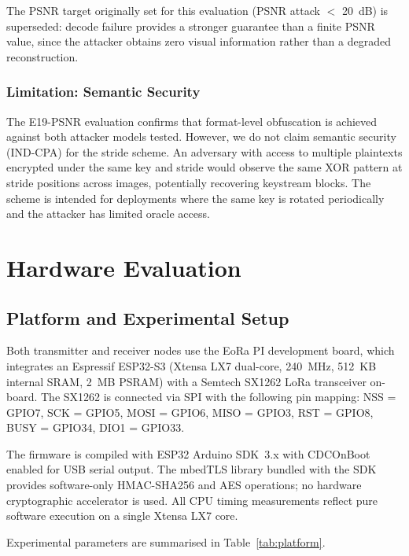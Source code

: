\documentclass[journal]{IEEEtran}
\begin{document}
The PSNR target originally set for this evaluation (PSNR attack $<$ 20~dB) is
superseded: decode failure provides a stronger guarantee than a finite PSNR
value, since the attacker obtains zero visual information rather than a
degraded reconstruction.

\subsubsection{Limitation: Semantic Security}

The E19-PSNR evaluation confirms that format-level obfuscation is achieved
against both attacker models tested.  However, we do not claim semantic
security (IND-CPA) for the stride scheme.  An adversary with access to multiple
plaintexts encrypted under the same key and stride would observe the same XOR
pattern at stride positions across images, potentially recovering keystream
blocks.  The scheme is intended for deployments where the same key is rotated
periodically and the attacker has limited oracle access.

\section{Hardware Evaluation}
\label{sec:eval}

\subsection{Platform and Experimental Setup}
\label{sec:platform}

Both transmitter and receiver nodes use the EoRa PI development board, which
integrates an Espressif ESP32-S3 \cite{esp32s3_datasheet} (Xtensa LX7 dual-core,
240~MHz, 512~KB internal SRAM, 2~MB PSRAM) with a Semtech SX1262 LoRa
transceiver \cite{semtech_sx1262} on-board.  The SX1262 is connected via SPI
with the following pin mapping: NSS = GPIO7, SCK = GPIO5, MOSI = GPIO6,
MISO = GPIO3, RST = GPIO8, BUSY = GPIO34, DIO1 = GPIO33.

The firmware is compiled with ESP32 Arduino SDK~3.x with CDCOnBoot enabled for
USB serial output.  The mbedTLS library bundled with the SDK provides
software-only HMAC-SHA256 and AES operations; no hardware cryptographic
accelerator is used.  All CPU timing measurements reflect pure software
execution on a single Xtensa LX7 core.

Experimental parameters are summarised in Table~\ref{tab:platform}.
\end{document}
